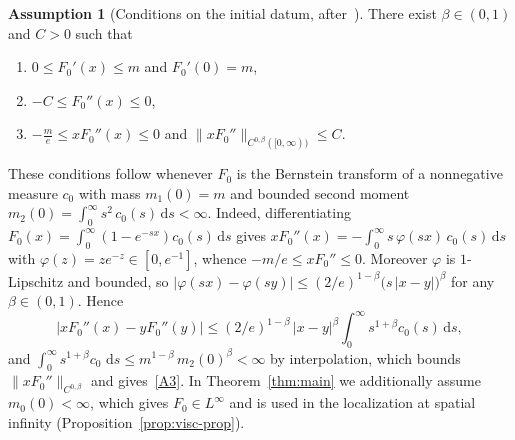 \documentclass[12pt]{amsart}
\numberwithin{equation}{section}
\theoremstyle{plain}
\theoremstyle{definition}
\newtheorem{assumption}[theorem]{Assumption}
\newcommand{\dd}{\,\mathrm{d}}
\begin{document}
\begin{assumption}[Conditions on the initial datum,
		after~\cite{TV}]\label{ass:data}
	There exist $\beta\in(0,1)$ and $C>0$ such that
	\begin{enumerate}[label=\textup{(A\arabic*)},ref=\textup{(A\arabic*)},leftmargin=3.2em]
		\item\label{A1} $0\le F_0'(x)\le m$ and $F_0'(0)=m$,
		\item\label{A2} $-C\le F_0''(x)\le0$,
		\item\label{A3} $\displaystyle-\frac{m}{e}\le xF_0''(x)\le0$
		      \quad and\quad
		      $\bigl\|xF_0''\bigr\|_{C^{0,\beta}([0,\infty))}\le C$.
	\end{enumerate}
\end{assumption}

\noindent These conditions follow whenever $F_0$ is the Bernstein transform of a
nonnegative measure $c_0$ with mass $m_1(0)=m$ and bounded second moment
$m_2(0)=\int_0^\infty s^2\,c_0(s)\dd s<\infty$. Indeed, differentiating
$F_0(x)=\int_0^\infty(1-e^{-sx})c_0(s)\dd s$ gives
$xF_0''(x)=-\int_0^\infty s\,\varphi(sx)\,c_0(s)\dd s$ with
$\varphi(z)=ze^{-z}\in[0,e^{-1}]$, whence $-m/e\le xF_0''\le0$. Moreover
$\varphi$ is $1$-Lipschitz and bounded, so
$|\varphi(sx)-\varphi(sy)|\le(2/e)^{1-\beta}\bigl(s\,|x-y|\bigr)^{\beta}$
for any
$\beta\in(0,1)$. Hence
\[
	\bigl|xF_0''(x)-yF_0''(y)\bigr|
	\le(2/e)^{1-\beta}\,|x-y|^{\beta}\int_0^\infty s^{1+\beta}c_0(s)\dd s,
\]
and $\int_0^\infty s^{1+\beta}c_0\,\dd s\le m^{1-\beta}\,m_2(0)^{\beta}<\infty$
by interpolation, which bounds $\|xF_0''\|_{C^{0,\beta}}$ and
gives~\ref{A3}. In Theorem~\ref{thm:main} we additionally assume
$m_0(0)<\infty$,
which gives $F_0\in L^\infty$ and is used in the localization at
spatial infinity
(Proposition~\ref{prop:visc-prop}).
\end{document}
